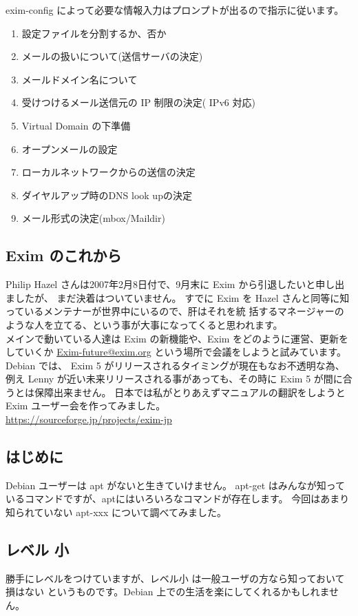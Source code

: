 \documentclass[mingoth,a4paper]{jsarticle}
\begin{document}
exim-config によって必要な情報入力はプロンプトが出るので指示に従います。 \\
\begin{enumerate}
\item 設定ファイルを分割するか、否か
\item メールの扱いについて(送信サーバの決定)
\item メールドメイン名について
\item 受けつけるメール送信元の IP 制限の決定( IPv6 対応)
\item Virtual Domain の下準備
\item オープンメールの設定
\item ローカルネットワークからの送信の決定
\item ダイヤルアップ時のDNS look upの決定
\item メール形式の決定(mbox/Maildir)
\end{enumerate}

\subsection{Exim のこれから}
 Philip Hazel さんは2007年2月8日付で、9月末に Exim から引退したいと申し出ましたが、
まだ決着はついていません。
すでに Exim を Hazel さんと同等に知っているメンテナーが世界中にいるので、肝はそれを統
括するマネージャーのような人を立てる、という事が大事になってくると思われます。\\
メインで動いている人達は Exim の新機能や、Exim をどのように運営、更新をしていくか 
\url{Exim-future@exim.org} という場所で会議をしようと試みています。\\
Debian では、 Exim 5 がリリースされるタイミングが現在もなお不透明な為、例え Lenny 
が近い未来リリースされる事があっても、その時に Exim 5 が間に合うとは保障出来ません。
日本では私がとりあえずマニュアルの翻訳をしようとExim ユーザー会を作ってみました。\\
\url{https://sourceforge.jp/projects/exim-jp}

\label{aptxxx}
\subsection{はじめに}
Debian ユーザーは apt がないと生きていけません。
apt-get はみんなが知っているコマンドですが、aptにはいろいろなコマンドが存在します。
今回はあまり知られていない apt-xxx について調べてみました。

\subsection{レベル 小}
勝手にレベルをつけていますが、レベル小 は一般ユーザの方なら知っておいて損はない
というものです。Debian 上での生活を楽にしてくれるかもしれません。
\end{document}
